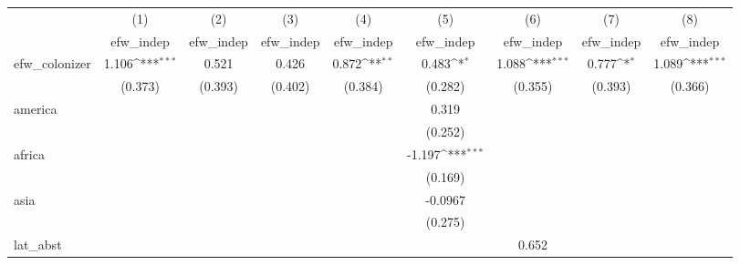 {
\def\sym#1{\ifmmode^{#1}\else\(^{#1}\)\fi}
\begin{tabular}{l*{8}{c}}
\hline\hline
            &\multicolumn{1}{c}{(1)}&\multicolumn{1}{c}{(2)}&\multicolumn{1}{c}{(3)}&\multicolumn{1}{c}{(4)}&\multicolumn{1}{c}{(5)}&\multicolumn{1}{c}{(6)}&\multicolumn{1}{c}{(7)}&\multicolumn{1}{c}{(8)}\\
            &\multicolumn{1}{c}{efw\_indep}&\multicolumn{1}{c}{efw\_indep}&\multicolumn{1}{c}{efw\_indep}&\multicolumn{1}{c}{efw\_indep}&\multicolumn{1}{c}{efw\_indep}&\multicolumn{1}{c}{efw\_indep}&\multicolumn{1}{c}{efw\_indep}&\multicolumn{1}{c}{efw\_indep}\\
\hline
efw\_colonizer&       1.106\sym{***}&       0.521         &       0.426         &       0.872\sym{**} &       0.483\sym{*}  &       1.088\sym{***}&       0.777\sym{*}  &       1.089\sym{***}\\
            &     (0.373)         &     (0.393)         &     (0.402)         &     (0.384)         &     (0.282)         &     (0.355)         &     (0.393)         &     (0.366)         \\
[1em]
america     &                     &                     &                     &                     &       0.319         &                     &                     &                     \\
            &                     &                     &                     &                     &     (0.252)         &                     &                     &                     \\
[1em]
africa      &                     &                     &                     &                     &      -1.197\sym{***}&                     &                     &                     \\
            &                     &                     &                     &                     &     (0.169)         &                     &                     &                     \\
[1em]
asia        &                     &                     &                     &                     &     -0.0967         &                     &                     &                     \\
            &                     &                     &                     &                     &     (0.275)         &                     &                     &                     \\
[1em]
lat\_abst    &                     &                     &                     &                     &                     &       0.652         &                     &                     \\

\end{tabular}}
